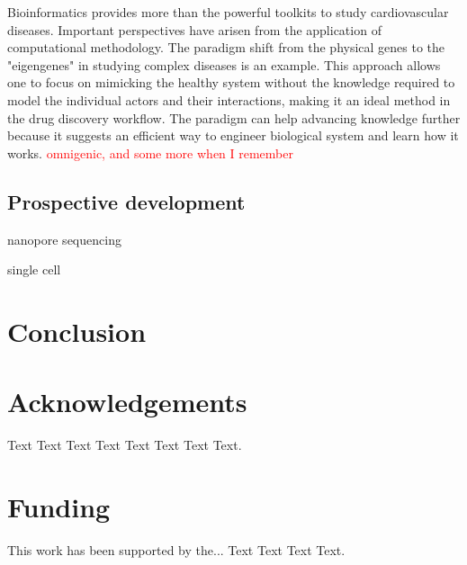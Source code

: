\documentclass[letter]{bioinfo}
\newcommand{\comment}[1]{\textcolor{red}{#1}}
\begin{document}
Bioinformatics provides more than the powerful toolkits to study cardiovascular diseases. Important perspectives have arisen from the application of computational methodology. The paradigm shift from the physical genes to the "eigengenes" in studying complex diseases \citep{Weiss:2012:Good} is an example. This approach allows one to focus on mimicking the healthy system without the knowledge required to model the individual actors and their interactions, making it an ideal method in the drug discovery workflow. The paradigm can help advancing knowledge further because it suggests an efficient way to engineer biological system and learn how it works.
\comment{omnigenic, and some more when I remember}


\subsection{Prospective development}

nanopore sequencing

single cell



\section{Conclusion}


%

\enlargethispage{12pt}




\section*{Acknowledgements}

Text Text Text Text Text Text  Text Text.  
\vspace*{-12pt}

\section*{Funding}

This work has been supported by the... Text Text  Text Text.\vspace*{-12pt}


%
%
%
%
%
%

\end{document}
